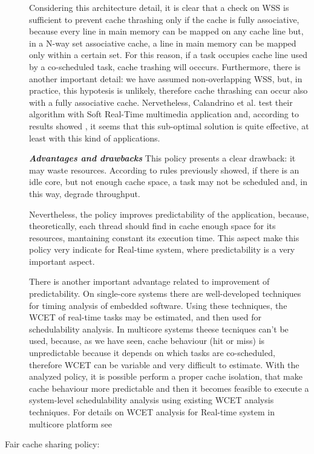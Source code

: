 \begin{description}
Considering this architecture detail, it is clear that a check on WSS is sufficient to prevent cache thrashing only if the cache is fully associative, 
because every line in main memory can be mapped on any cache line but, in a N-way set associative cache, a line in main memory can be mapped only within a 
certain set. For this reason, if a task occupies cache line used by a co-scheduled task, cache trashing will occcurs. Furthermore, there is another 
important detail: we have assumed non-overlapping WSS, but, in practice, this hypotesis is unlikely, therefore cache thrashing can occur also with a 
fully associative cache. Nervetheless, Calandrino et al. test their algorithm with Soft Real-Time multimedia application and, according to results showed 
\cite{calandro}, it seems that this sub-optimal solution is quite effective, at least with this kind of applications.

\textbf{\textit{Advantages and drawbacks}} This policy presents a clear drawback: it may waste resources. According to rules previously showed, if there 
is an idle core, but not enough cache space, a task may not be scheduled and, in this way, degrade throughput. 

Nevertheless, the policy improves predictability of the application, because, theoretically, each thread should find in cache enough space for its 
resources, mantaining constant its execution time. This aspect make this policy very indicate for Real-time system, where predictability is a very 
important aspect.

There is another important advantage related to improvement of predictability. On single-core systems there are well-developed techniques for timing 
analysis of embedded software. Using these techniques, the WCET of real-time tasks may be estimated, and then used for schedulability analysis. 
In multicore systems theese tecniques can't be used, because, as we have seen, cache behaviour (hit or miss) is unpredictable because it depends on which 
tasks are co-scheduled, therefore WCET can be variable and very difficult to estimate. With the analyzed policy, it is possible perform a proper cache 
isolation, that make cache behaviour more predictable and then it becomes feasible to execute a system-level schedulability analysis using existing WCET 
analysis techniques. For details on WCET analysis for Real-time system in multicore platform see \cite{guann}


\item[Fair cache sharing policy:]


\end{description}
